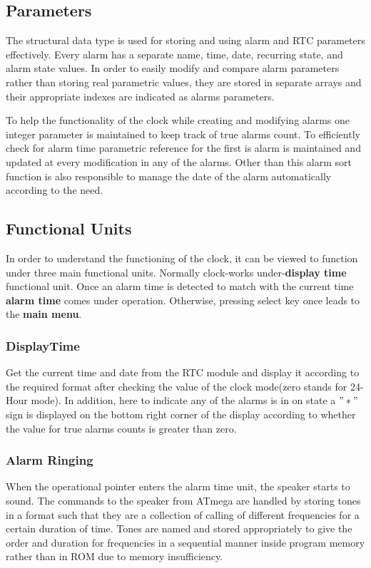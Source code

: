 \documentclass[12pt,twocolumn]{article}
\begin{document}
    \subsection{Parameters}
The structural data type is used for storing and using alarm and RTC parameters effectively. 
Every alarm has a separate name, time, date, recurring state, and alarm state values.
In order to easily modify and compare alarm parameters rather than storing real parametric values, 
they are stored in separate arrays and their appropriate indexes are indicated as alarms parameters. 

To help the functionality of the clock while creating and modifying alarms one integer parameter
is maintained to keep track of true alarms count. To efficiently check for alarm time parametric
reference for the first is alarm is maintained and updated at every modification in any of the
alarms. Other than this alarm sort function is also responsible to manage the date of the alarm
automatically according to the need.

    \subsection{Functional Units}
In order to understand the functioning of the clock, it can be viewed to function under three main 
functional units. Normally clock-works under-\textbf{display time} functional unit. Once an alarm 
time is detected to match with the current time \textbf{alarm time} comes under operation. 
Otherwise, pressing select key once leads to the \textbf{main menu}.

        \subsubsection{DisplayTime}
Get the current time and date from the RTC module and display it according to the required format 
after checking the value of the clock mode(zero stands for 24-Hour mode). In addition, here to indicate
any of the alarms is in on state a $"*"$ sign is displayed on the bottom right corner of the display according 
to whether the value for true alarms counts is greater than zero.

        \subsubsection{Alarm Ringing}
When the operational pointer enters the alarm time unit, the speaker starts to sound.
The commands to the speaker from ATmega are handled by storing tones in a format such 
that they are a collection of calling of different frequencies for a certain duration of 
time. Tones are named and stored appropriately to give the order and duration for frequencies 
in a sequential manner inside program memory rather than in ROM due to memory insufficiency. 
\end{document}
